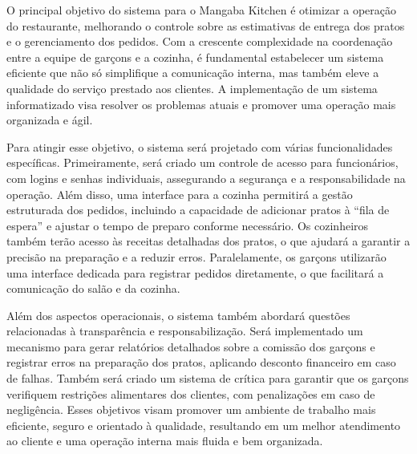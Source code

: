 \hspace{4.5mm}
O principal objetivo do sistema para o Mangaba Kitchen é otimizar a operação do restaurante, melhorando o controle sobre as estimativas de entrega dos pratos e o gerenciamento dos pedidos. Com a crescente complexidade na coordenação entre a equipe de garçons e a cozinha, é fundamental estabelecer um sistema eficiente que não só simplifique a comunicação interna, mas também eleve a qualidade do serviço prestado aos clientes. A implementação de um sistema informatizado visa resolver os problemas atuais e promover uma operação mais organizada e ágil.
\par
Para atingir esse objetivo, o sistema será projetado com várias funcionalidades específicas. Primeiramente, será criado um controle de acesso para funcionários, com logins e senhas individuais, assegurando a segurança e a responsabilidade na operação. Além disso, uma interface para a cozinha permitirá a gestão estruturada dos pedidos, incluindo a capacidade de adicionar pratos à “fila de espera” e ajustar o tempo de preparo conforme necessário. Os cozinheiros também terão acesso às receitas detalhadas dos pratos, o que ajudará a garantir a precisão na preparação e a reduzir erros. Paralelamente, os garçons utilizarão uma interface dedicada para registrar pedidos diretamente, o que facilitará a comunicação do salão e da cozinha.
\par
Além dos aspectos operacionais, o sistema também abordará questões relacionadas à transparência e responsabilização. Será implementado um mecanismo para gerar relatórios detalhados sobre a comissão dos garçons e registrar erros na preparação dos pratos, aplicando desconto financeiro em caso de falhas. Também será criado um sistema de crítica para garantir que os garçons verifiquem restrições alimentares dos clientes, com penalizações em caso de negligência. Esses objetivos visam promover um ambiente de trabalho mais eficiente, seguro e orientado à qualidade, resultando em um melhor atendimento ao cliente e uma operação interna mais fluida e bem organizada.
